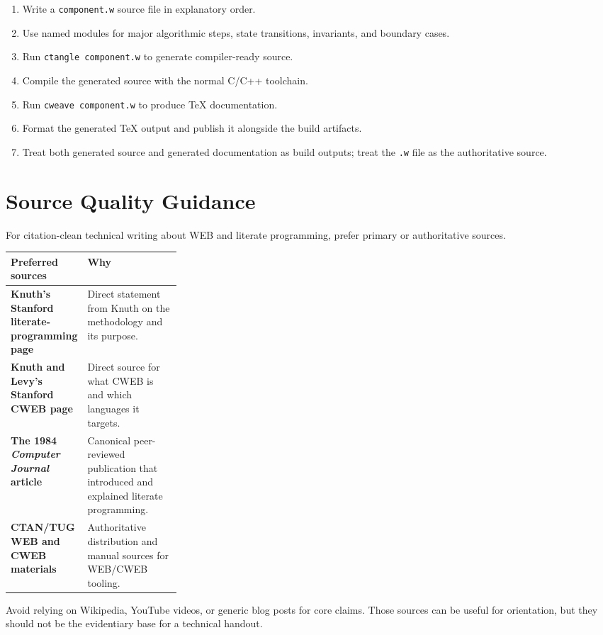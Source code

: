 \documentclass[11pt]{article}
\begin{document}
\begin{enumerate}
  \item Write a \texttt{component.w} source file in explanatory order.
  \item Use named modules for major algorithmic steps, state transitions, invariants, and boundary cases.
  \item Run \texttt{ctangle component.w} to generate compiler-ready source.
  \item Compile the generated source with the normal C/C++ toolchain.
  \item Run \texttt{cweave component.w} to produce TeX documentation.
  \item Format the generated TeX output and publish it alongside the build artifacts.
  \item Treat both generated source and generated documentation as build outputs; treat the \texttt{.w} file as the authoritative source.
\end{enumerate}

\section{Source Quality Guidance}

For citation-clean technical writing about WEB and literate programming, prefer primary or authoritative sources.

\begin{center}
\begin{tabularx}{0.95\linewidth}{>{\bfseries}p{0.28\linewidth} X}
\toprule
Preferred sources & Why \\
\midrule
Knuth's Stanford literate-programming page & Direct statement from Knuth on the methodology and its purpose. \\
Knuth and Levy's Stanford CWEB page & Direct source for what CWEB is and which languages it targets. \\
The 1984 \emph{Computer Journal} article & Canonical peer-reviewed publication that introduced and explained literate programming. \\
CTAN/TUG WEB and CWEB materials & Authoritative distribution and manual sources for WEB/CWEB tooling. \\
\bottomrule
\end{tabularx}
\end{center}

Avoid relying on Wikipedia, YouTube videos, or generic blog posts for core claims. Those sources can be useful for orientation, but they should not be the evidentiary base for a technical handout.
\end{document}
